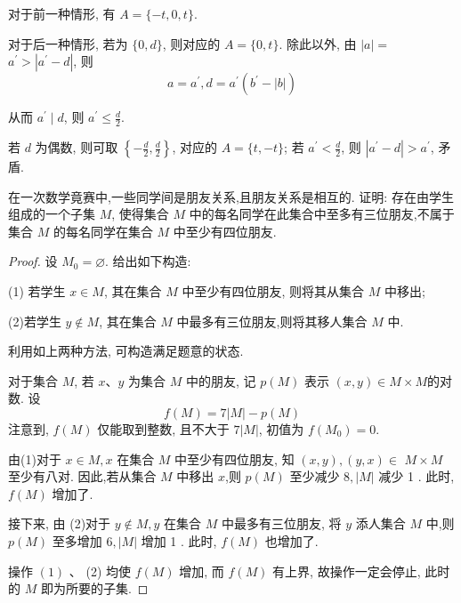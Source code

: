 \begin{solution}
	对于前一种情形, 有 $A=\{-t, 0, t\}$.

	对于后一种情形, 若为 $\{0, d\}$, 则对应的 $A=\{0, t\}$. 除此以外, 由 $|a|=$ $a^{\prime}>\left|a^{\prime}-d\right|$, 则
	$$
		a=a^{\prime}, d=a^{\prime}\left(b^{\prime}-|b|\right)
	$$

	从而 $a^{\prime} \mid d$, 则 $a^{\prime} \leqslant \frac{d}{2}$.

	若 $d$ 为偶数, 则可取 $\left\{-\frac{d}{2}, \frac{d}{2}\right\}$, 对应的 $A=\{t,-t\}$; 若 $a^{\prime}<\frac{d}{2}$, 则 $\left|a^{\prime}-d\right|>a^{\prime}$, 矛盾.
\end{solution}

\begin{example}
	在一次数学竟赛中,一些同学间是朋友关系,且朋友关系是相互的. 证明: 存在由学生组成的一个子集 $M$, 使得集合 $M$ 中的每名同学在此集合中至多有三位朋友,不属于集合 $M$ 的每名同学在集合 $M$ 中至少有四位朋友.
\end{example}
\begin{proof}
	设 $M_{0}=\varnothing$. 给出如下构造:

	(1) 若学生 $x \in M$, 其在集合 $M$ 中至少有四位朋友, 则将其从集合 $M$ 中移出;

	(2)若学生 $y \notin M$, 其在集合 $M$ 中最多有三位朋友,则将其移人集合 $M$ 中.

	利用如上两种方法, 可构造满足题意的状态.

	对于集合 $M$, 若 $x 、 y$ 为集合 $M$ 中的朋友, 记 $p(M)$ 表示 $(x, y) \in M \times M$的对数. 设
	$$
		f(M)=7|M|-p(M)
	$$
	注意到, $f(M)$ 仅能取到整数, 且不大于 $7|M|$, 初值为 $f\left(M_{0}\right)=0$.

	由(1)对于 $x \in M, x$ 在集合 $M$ 中至少有四位朋友, 知 $(x, y),(y, x) \in$ $M \times M$ 至少有八对. 因此,若从集合 $M$ 中移出 $x$,则 $p(M)$ 至少减少 $8,|M|$ 减少 1 . 此时, $f(M)$ 增加了.

	接下来, 由 (2)对于 $y \notin M, y$ 在集合 $M$ 中最多有三位朋友, 将 $y$ 添人集合 $M$ 中,则 $p(M)$ 至多增加 $6,|M|$ 增加 1 . 此时, $f(M)$ 也增加了.

	操作 $(1)$ 、 (2) 均使 $f(M)$ 增加, 而 $f(M)$ 有上界, 故操作一定会停止, 此时的 $M$ 即为所要的子集.
\end{proof}

